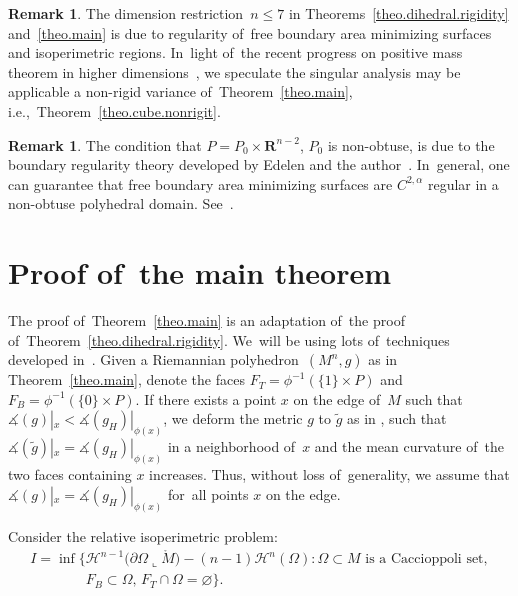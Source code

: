 \documentclass[pdftex]{sigma}
\numberwithin{equation}{section}
\theoremstyle{definition}
\newtheorem{rema}[prop]{Remark}
\newcommand{\RR}{\mathbf{R}}
\newcommand{\cH}{\mathcal H}
\begin{document}
\begin{rema}
The dimension restriction~$n\le 7$ in Theorems~\ref{theo.dihedral.rigidity} and~\ref{theo.main} is due to regularity of~free boundary area minimizing surfaces and isoperimetric regions. In~light of~the recent progress on positive mass theorem in higher dimensions~\cite{SchoenYau2017positive}, we speculate the singular analysis may be applicable a non-rigid variance of~Theorem~\ref{theo.main}, i.e.,~Theorem~\ref{theo.cube.nonrigit}.
\end{rema}

\begin{rema}
The condition that $P=P_0\times \RR^{n-2}$, $P_0$ is non-obtuse, is due to the boundary regularity theory developed by Edelen and the author~\cite{EdelenLi2020regularity}. In~general, one can guarantee that free boundary area minimizing surfaces are $C^{2,\alpha}$ regular in a non-obtuse polyhedral domain. See~\cite[Section~9]{EdelenLi2020regularity}.
\end{rema}


\section{Proof of~the main theorem}

The proof of~Theorem~\ref{theo.main} is an adaptation of~the proof of~Theorem~\ref{theo.dihedral.rigidity}. We~will be using lots of~techniques developed in~\cite{li2019dihedral}. Given a Riemannian polyhedron~$(M^n,g)$ as in Theorem~\ref{theo.main}, denote the faces $F_T=\phi^{-1}(\{1\}\times P)$ and~$F_B=\phi^{-1}(\{0\}\times P)$. If there exists a point $x$ on the edge of~$M$ such that $\measuredangle(g)|_x<\measuredangle(g_H)|_{\phi(x)}$, we deform the metric $g$ to $\tilde{g}$ as in \cite[Section~11]{Gromov2018Metric}, such that $\measuredangle(\tilde{g})|_x=\measuredangle(g_H)|_{\phi(x)}$ in a neighborhood of~$x$ and the mean curvature of~the two faces containing $x$ increases. Thus, without loss of~generality, we assume that $\measuredangle(g)|_x=\measuredangle(g_H)|_{\phi(x)}$ for~all points $x$ on the edge.


Consider the relative isoperimetric problem:
\begin{gather}
I=\inf\big\{\cH^{n-1}\big(\partial \Omega\llcorner \mathring{M}\big)-(n-1)\cH^n(\Omega)\colon
\Omega\subset M \text{ is a Caccioppoli set},\nonumber
\\ \phantom{I=\inf\{}
F_B\subset \Omega,\, F_T\cap \Omega=\varnothing\big\}.\label{problem.variation}
\end{gather}
\end{document}
